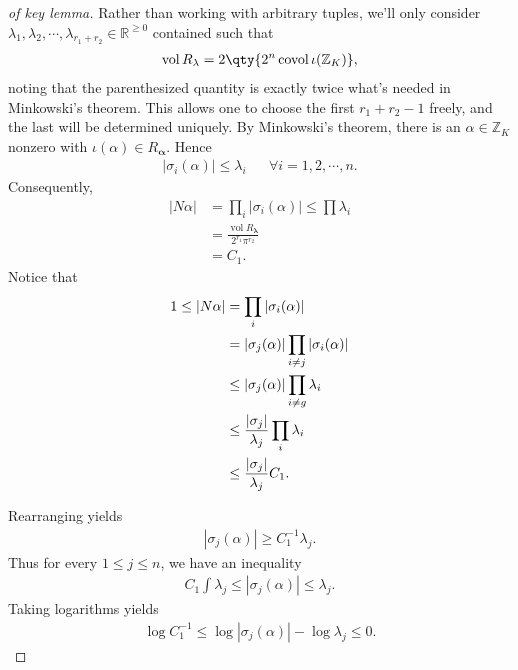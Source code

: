 \begin{proof}[of key lemma]

Rather than working with arbitrary tuples, we'll only consider
\({ {\lambda}_1, {\lambda}_2, \cdots, {\lambda}_{r_1 + r_2}} \in {\mathbb{R}}^{\geq 0}\)
contained such that
\begin{align*}
\operatorname{vol}R_{\mathbf{\lambda}} = 2 \qty{ 2^n \operatorname{covol}\iota({\mathbb{Z}}_K) }
,\end{align*}
noting that the parenthesized quantity is exactly twice what's needed in
Minkowski's theorem. This allows one to choose the first \(r_1 + r_2-1\)
freely, and the last will be determined uniquely. By Minkowski's
theorem, there is an \(\alpha\in {\mathbb{Z}}_K\) nonzero with
\(\iota( \alpha)\in R_{\mathbf{\alpha}}\). Hence
\begin{align*}
{\left\lvert { \sigma_i( \alpha)} \right\rvert} \leq \lambda_i && \forall i=1,2,\cdots, n
.\end{align*}
Consequently,
\begin{align*}
{\left\lvert {N \alpha} \right\rvert} 
&= \prod_{i} {\left\lvert {\sigma_i( \alpha)} \right\rvert}\leq \prod \lambda_i \\
&= \frac{ \operatorname{vol}R_{\mathbf{\lambda}}} {2^{r_1} \pi^{r_2} } \\
&= C_1
.\end{align*}
Notice that
\begin{align*}
1 \leq {\left\lvert {N \alpha} \right\rvert} 
&= \prod_i {\left\lvert { \sigma_i( \alpha)} \right\rvert} \\
&= {\left\lvert { \sigma_j( \alpha)} \right\rvert} \prod_{i\neq j} {\left\lvert { \sigma_i( \alpha)} \right\rvert} \\
&\leq {\left\lvert { \sigma_j ( \alpha)} \right\rvert} \prod_{i\neq g} \lambda_i \\
&\leq { {\left\lvert { \sigma_j } \right\rvert} \over \lambda_j } \prod_i \lambda_i \\
&\leq { {\left\lvert { \sigma_j } \right\rvert} \over \lambda_j } C_1 
.\end{align*}

Rearranging yields
\begin{align*}
{\left\lvert { \sigma_j ( \alpha)} \right\rvert} \geq C_1^{-1}\lambda_j
.\end{align*}
Thus for every \(1\leq j \leq n\), we have an inequality
\begin{align*}
C_1\int \lambda_j \leq {\left\lvert { \sigma_j( \alpha)} \right\rvert} \leq \lambda_j
.\end{align*}
Taking logarithms yields
\begin{align*}
\log C_1^{-1}\leq \log {\left\lvert { \sigma_j( \alpha)} \right\rvert} - \log \lambda_j \leq 0
.\end{align*}


\end{proof}

